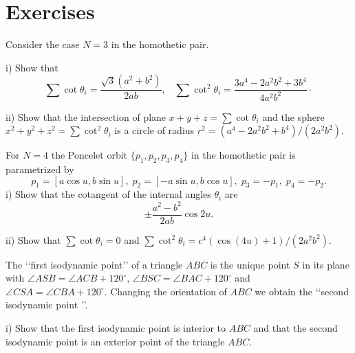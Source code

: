
\section{Exercises  }
\begin{exercise}
\label{ex:1_chap6} Consider the case   $N=3$ in the homothetic pair.

\noindent i) Show that
\[\sum\cot\theta_i= \frac{\sqrt{3}(a^2 + b^2)}{2ab },\;\;\; \sum\cot^2\theta_i=\frac{3a^4 - 2a^2b^2 + 3b^4}{4a^2b^2}\cdot\]

\noindent ii) Show that the intersection of plane $x+y+z=\sum\cot\theta_i$ and the sphere $x^2+y^2+z^2=\sum\cot^2\theta_i$ is a circle of radius $r^2=(a^4 - 2a^2b^2 + b^4)/(2a^2b^2).$
\end{exercise}
\begin{exercise}
\label{ex:2_chap6}
 For  $N=4 $ the Poncelet orbit $\{p_1,p_2,p_3,p_4\}$ in the homothetic pair is parametrized by
\[p_1=[a\cos u,b\sin u],\; p_2=[-a\sin u, b\cos u], \;p_3=-p_1,\; p_4=-p_2.\]
\noindent i) Show that the cotangent of the internal angles $\theta_i$ are
\[\pm \frac{a^2-b^2}{2ab}\cos 2u.\]

\noindent ii) Show that $\sum\cot\theta_i=0$ and $\sum\cot^2\theta_i=c^4(\cos(4u) + 1)/(2a^2b^2).$

\end{exercise}

\begin{exercise}\label{ex:3_chap6}
The  \lq\lq  first isodynamic point\rq\rq \; of a triangle $ABC$ is the unique point $S$ in its plane with $   \angle ASB = \angle ACB + 120^\circ$, $   \angle BSC = \angle BAC + 120^\circ$   and $\angle CSA = \angle CBA + 120^\circ.$ Changing the orientation of $ABC$ we obtain the \lq\lq second isodynamic point \rq\rq.

\noindent i) Show that the first isodynamic point is interior to $ABC$ and that the  second isodynamic point is an exterior point of the triangle $ABC$.


\end{exercise}